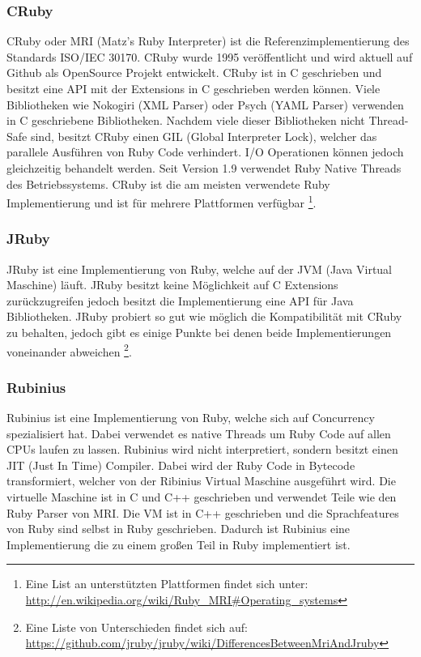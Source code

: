 \subsubsection{CRuby}
CRuby oder MRI (Matz's Ruby Interpreter) ist die Referenzimplementierung des Standards ISO/IEC 30170. CRuby wurde 1995 veröffentlicht und wird aktuell auf Github als OpenSource Projekt entwickelt. CRuby ist in C geschrieben und besitzt eine API mit der Extensions in C geschrieben werden können. Viele Bibliotheken wie Nokogiri (XML Parser) oder Psych (YAML Parser) verwenden in C geschriebene Bibliotheken. Nachdem viele dieser Bibliotheken nicht Thread-Safe sind, besitzt CRuby einen GIL (Global Interpreter Lock), welcher das parallele Ausführen von Ruby Code verhindert. I/O Operationen können jedoch gleichzeitig behandelt werden. Seit Version 1.9 verwendet Ruby Native Threads des Betriebssystems. CRuby ist die am meisten verwendete Ruby Implementierung und ist für mehrere Plattformen verfügbar \footnote{Eine List an unterstützten Plattformen findet sich unter: \url{http://en.wikipedia.org/wiki/Ruby_MRI#Operating_systems}}.

\subsubsection{JRuby}

JRuby ist eine Implementierung von Ruby, welche auf der JVM (Java Virtual Maschine) läuft. JRuby besitzt keine Möglichkeit auf C Extensions zurückzugreifen jedoch besitzt die Implementierung eine API für Java Bibliotheken. JRuby probiert so gut wie möglich die Kompatibilität mit CRuby zu behalten, jedoch gibt es einige Punkte bei denen beide Implementierungen voneinander abweichen \footnote{Eine Liste von Unterschieden findet sich auf: \url{https://github.com/jruby/jruby/wiki/DifferencesBetweenMriAndJruby}}. 

\subsubsection{Rubinius}
Rubinius ist eine Implementierung von Ruby, welche sich auf Concurrency spezialisiert hat. Dabei verwendet es native Threads um Ruby Code auf allen CPUs laufen zu lassen. Rubinius wird nicht interpretiert, sondern besitzt einen JIT (Just In Time) Compiler. Dabei wird der Ruby Code in Bytecode transformiert, welcher von der Ribinius Virtual Maschine ausgeführt wird. Die virtuelle Maschine ist in C und C++ geschrieben und verwendet Teile wie den Ruby Parser von MRI. Die VM ist in C++ geschrieben und die Sprachfeatures von Ruby sind selbst in Ruby geschrieben. Dadurch ist Rubinius eine Implementierung die zu einem großen Teil in Ruby implementiert ist. 

